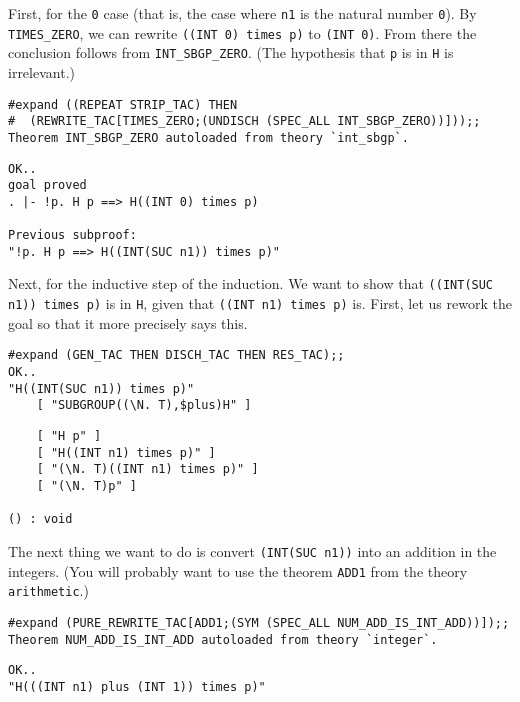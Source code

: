 First, for the {\small\tt 0} case (that is, the case where {\small\tt n1}
is the natural number {\small\tt 0}).  By {\small\verb+TIMES_ZERO+}, we
can rewrite {\small\verb+((INT 0) times p)+} to {\small\verb+(INT 0)+}.
From there the conclusion follows from {\small\verb+INT_SBGP_ZERO+}.
(The hypothesis that {\small\tt p} is in {\small\tt H} is irrelevant.)
\begin{session}
\begin{verbatim}
#expand ((REPEAT STRIP_TAC) THEN
#  (REWRITE_TAC[TIMES_ZERO;(UNDISCH (SPEC_ALL INT_SBGP_ZERO))]));;
Theorem INT_SBGP_ZERO autoloaded from theory `int_sbgp`.
\end{verbatim}
\mvdots
\begin{verbatim}
OK..
goal proved
. |- !p. H p ==> H((INT 0) times p)

Previous subproof:
"!p. H p ==> H((INT(SUC n1)) times p)"
\end{verbatim}
\evdots
\end{session}

Next, for the inductive step of the induction.  We want to show that
{\small\verb+((INT(SUC n1)) times p)+} is in {\small\tt H}, given that
{\small\verb+((INT n1) times p)+} is.  First, let us rework the goal
so that it more precisely says this. 
\begin{session}
\begin{verbatim}
#expand (GEN_TAC THEN DISCH_TAC THEN RES_TAC);;
OK..
"H((INT(SUC n1)) times p)"
    [ "SUBGROUP((\N. T),$plus)H" ]
\end{verbatim}
\mvdots
\begin{verbatim}
    [ "H p" ]
    [ "H((INT n1) times p)" ]
    [ "(\N. T)((INT n1) times p)" ]
    [ "(\N. T)p" ]

() : void
\end{verbatim}
\end{session}

The next thing we want to do is convert {\small\verb+(INT(SUC n1))+}
into an addition in the integers.  (You will probably want to use the
theorem {\small\verb+ADD1+} from the theory {\small\verb+arithmetic+}.)
\begin{session}
\begin{verbatim}
#expand (PURE_REWRITE_TAC[ADD1;(SYM (SPEC_ALL NUM_ADD_IS_INT_ADD))]);;
Theorem NUM_ADD_IS_INT_ADD autoloaded from theory `integer`.
\end{verbatim}
\mvdots
\begin{verbatim}
OK..
"H(((INT n1) plus (INT 1)) times p)"
\end{verbatim}
\evdots
\end{session}

